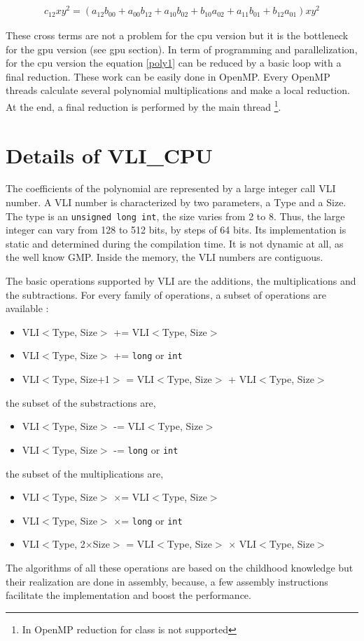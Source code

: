 \documentclass[11pt]{amsart}
\begin{document}
\begin{eqnarray}
c_{12}xy^2 = \left(a_{12}b_{00}  +  a_{00}b_{12} + a_{10}b_{02}   + b_{10}a_{02}  +  a_{11}b_{01} + b_{12}a_{01}  \right)xy^2
\end{eqnarray}

These cross terms are not a problem for the cpu version but it is the bottleneck for the gpu version  (see gpu section). In term of  programming and parallelization, 
for the cpu version the equation  \ref{poly1} can be reduced by a basic loop with a final reduction. These work can be easily done in OpenMP. Every OpenMP threads
calculate several  polynomial multiplications and make a local reduction. At the end, a final reduction is performed  by the main thread \footnote{In OpenMP reduction for class is not supported}. 

\section*{Details of VLI\_CPU}

The coefficients of the polynomial are represented by a large integer call VLI number.  A VLI number is characterized by two parameters, a Type and a Size.
 The type is an \texttt{unsigned long int},  the size varies from 2 to 8. Thus, the large integer can vary from 128 to 512 bits, by steps of 64 bits. Its implementation is static and determined during the compilation time.
 It is not dynamic at all, as the well know GMP. Inside the memory, the VLI numbers are  contiguous. 
 
The basic operations supported by VLI are the additions, the multiplications and the subtractions. For every family of operations, a subset of operations are available :
\begin{itemize}
\item VLI$<$Type, Size$>$ += VLI$<$Type, Size$>$
\item VLI$<$Type, Size$>$ += \texttt{long} or \texttt{int}
\item VLI$<$Type, Size+1$>$ = VLI$<$Type, Size$>$ + VLI$<$Type, Size$>$
\end{itemize}
the subset of the substractions are,
\begin{itemize}
\item VLI$<$Type, Size$>$ -= VLI$<$Type, Size$>$
\item VLI$<$Type, Size$>$ -= \texttt{long} or \texttt{int}
\end{itemize}
the subset of the  multiplications are,
\begin{itemize}
\item VLI$<$Type, Size$>$  $\times$= VLI$<$Type, Size$>$
\item VLI$<$Type, Size$>$  $\times$= \texttt{long} or \texttt{int}
\item VLI$<$Type, 2$\times$Size$>$ = VLI$<$Type, Size$>$ $\times$ VLI$<$Type, Size$>$
\end{itemize}
The algorithms of all these operations are based on the childhood knowledge but their realization are done in assembly, because, a few assembly instructions facilitate the implementation and boost the performance.
\end{document}
